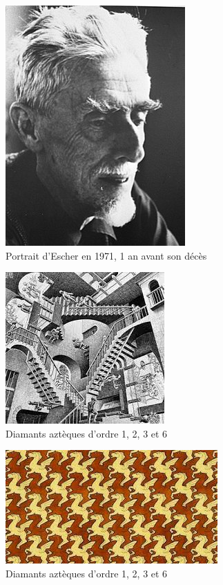 \documentclass{article}
\begin{document}
\begin{figure} [h]
    \center
    \includegraphics [scale=0.5] {image/escher.jpg}
    \caption{Portrait d'Escher en 1971, 1 an avant son décès}
\end{figure}

\begin{figure} [h]
    \center
    \includegraphics [scale=0.5] {image/dessin1_escherjpg.jpg}
    \caption{Diamants aztèques d'ordre 1, 2, 3 et 6}
\end{figure}

\begin{figure} [h]
    \center
    \includegraphics [scale=0.5] {image/dessin2_escherjpg.jpg}
    \caption{Diamants aztèques d'ordre 1, 2, 3 et 6}
\end{figure}
\end{document}
